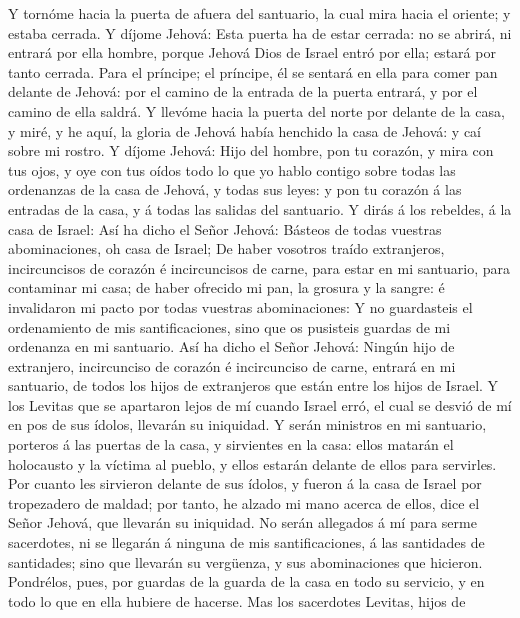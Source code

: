  Y tornóme hacia la puerta de afuera del santuario, la cual
mira hacia el oriente; y estaba cerrada.  Y díjome Jehová:
Esta puerta ha de estar cerrada: no se abrirá, ni entrará por ella
hombre, porque Jehová Dios de Israel entró por ella; estará por tanto
cerrada.  Para el príncipe; el príncipe, él se sentará en
ella para comer pan delante de Jehová: por el camino de la entrada de la
puerta entrará, y por el camino de ella saldrá.  Y llevóme
hacia la puerta del norte por delante de la casa, y miré, y he aquí, la
gloria de Jehová había henchido la casa de Jehová: y caí sobre mi
rostro.  Y díjome Jehová: Hijo del hombre, pon tu corazón, y
mira con tus ojos, y oye con tus oídos todo lo que yo hablo contigo
sobre todas las ordenanzas de la casa de Jehová, y todas sus leyes: y
pon tu corazón á las entradas de la casa, y á todas las salidas del
santuario.  Y dirás á los rebeldes, á la casa de Israel: Así
ha dicho el Señor Jehová: Básteos de todas vuestras abominaciones, oh
casa de Israel;  De haber vosotros traído extranjeros,
incircuncisos de corazón é incircuncisos de carne, para estar en mi
santuario, para contaminar mi casa; de haber ofrecido mi pan, la grosura
y la sangre: é invalidaron mi pacto por todas vuestras abominaciones:
 Y no guardasteis el ordenamiento de mis santificaciones,
sino que os pusisteis guardas de mi ordenanza en mi santuario.
 Así ha dicho el Señor Jehová: Ningún hijo de extranjero,
incircunciso de corazón é incircunciso de carne, entrará en mi
santuario, de todos los hijos de extranjeros que están entre los hijos
de Israel.  Y los Levitas que se apartaron lejos de mí
cuando Israel erró, el cual se desvió de mí en pos de sus ídolos,
llevarán su iniquidad.  Y serán ministros en mi santuario,
porteros á las puertas de la casa, y sirvientes en la casa: ellos
matarán el holocausto y la víctima al pueblo, y ellos estarán delante de
ellos para servirles.  Por cuanto les sirvieron delante de
sus ídolos, y fueron á la casa de Israel por tropezadero de maldad; por
tanto, he alzado mi mano acerca de ellos, dice el Señor Jehová, que
llevarán su iniquidad.  No serán allegados á mí para serme
sacerdotes, ni se llegarán á ninguna de mis santificaciones, á las
santidades de santidades; sino que llevarán su vergüenza, y sus
abominaciones que hicieron.  Pondrélos, pues, por guardas
de la guarda de la casa en todo su servicio, y en todo lo que en ella
hubiere de hacerse.  Mas los sacerdotes Levitas, hijos de
